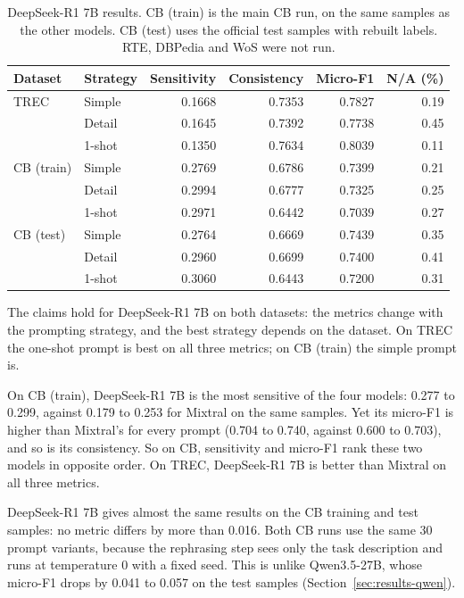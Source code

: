 \begin{table}[H]
\centering
\caption{DeepSeek-R1 7B results. CB (train) is the main CB run, on the same
samples as the other models. CB (test) uses the official test samples with
rebuilt labels. RTE, DBPedia and WoS were not run.}
\label{tab:deepseek-results}
\small
\begin{tabular}{llrrrr}
\toprule
Dataset & Strategy & Sensitivity & Consistency & Micro-F1 & N/A (\%) \\
\midrule
TREC & Simple  & 0.1668 & 0.7353 & 0.7827 & 0.19 \\
     & Detail  & 0.1645 & 0.7392 & 0.7738 & 0.45 \\
     & 1-shot  & 0.1350 & 0.7634 & 0.8039 & 0.11 \\
\midrule
CB (train) & Simple  & 0.2769 & 0.6786 & 0.7399 & 0.21 \\
           & Detail  & 0.2994 & 0.6777 & 0.7325 & 0.25 \\
           & 1-shot  & 0.2971 & 0.6442 & 0.7039 & 0.27 \\
\midrule
CB (test) & Simple  & 0.2764 & 0.6669 & 0.7439 & 0.35 \\
          & Detail  & 0.2960 & 0.6699 & 0.7400 & 0.41 \\
          & 1-shot  & 0.3060 & 0.6443 & 0.7200 & 0.31 \\
\bottomrule
\end{tabular}
\end{table}

The claims hold for DeepSeek-R1 7B on both datasets: the metrics change with
the prompting strategy, and the best strategy depends on the dataset. On TREC
the one-shot prompt is best on all three metrics; on CB (train) the simple
prompt is.

On CB (train), DeepSeek-R1 7B is the most sensitive of the four models:
0.277 to 0.299, against 0.179 to 0.253 for Mixtral on the same samples. Yet its
micro-F1 is higher than Mixtral's for every prompt (0.704 to 0.740, against
0.600 to 0.703), and so is its consistency. So on CB, sensitivity and micro-F1
rank these two models in opposite order. On TREC, DeepSeek-R1 7B is better than
Mixtral on all three metrics.

DeepSeek-R1 7B gives almost the same results on the CB training and test
samples: no metric differs by more than 0.016. Both CB runs use the same 30
prompt variants, because the rephrasing step sees only the task description
and runs at temperature 0 with a fixed seed. This is unlike Qwen3.5-27B, whose
micro-F1 drops by 0.041 to 0.057 on the test samples
(Section~\ref{sec:results-qwen}).

